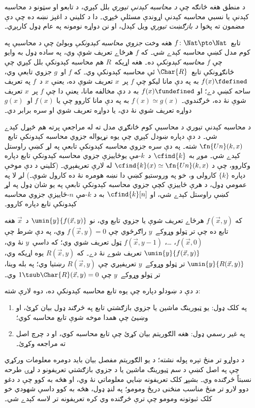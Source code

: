 \documentclass[../../../include/open-logic-section]{subfiles}
\begin{document}

د منطق هغه څانګه چې \emph{د محاسبه کېدنې تيوري} بلل کېږي، د تابعو او
سټونو د محاسبه کېدنې يا نسبي محاسبه کېدنې اړوندې مسئلې څېړي۔ دا د
کليني د اغېز نښه ده چې دې مضمون ته پخوا \emph{د بازګښت تيوري} ويل
کېدل، او نن دواړه نومونه په عام ډول کارېږي۔

تابع~$f\colon \Nat \pto \Nat$ هغه وخت \emph{جزوي محاسبه کېدونکې}
وبولئ چې د محاسبې په کوم مدل کښې محاسبه کېدے شي۔ که $f$ هرځاے تعريف
شوې وي، په ساده ډول به وايو چې $f$ \emph{محاسبه کېدونکې} ده۔ هغه
اړيکه~$R$ هم محاسبه کېدونکې بلل کېږي چې ځانګړونکې تابع~$\Char{R}$ ئې
محاسبه کېدونکې وي۔ که $f$ او~$g$ جزوي تابعې وي، $f(x) \fdefined$ به
په دې مانا ليکو چې $f$ پر~$x$ تعريف شوې ده، يعنې $x$ د~$f$ په تعريف
ساحه کښې دے؛ او $f(x) \fundefined$ به د دې مخالفه مانا، يعنې دا چې
$f$ پر~$x$ تعريف شوې نۀ ده، څرګندوي۔ $f(x) \simeq g(x)$ به په دې
مانا کاروو چې يا $f(x)$ او~$g(x)$ دواړه تعريف شوي نۀ دي، يا دواړه
تعريف شوي او سره برابر دي۔

د محاسبه کېدنې تيوري د محاسبې کوم ځانګړي مدل ته له مراجعې پرته هم
څېړل کېدے شي۔ د دې دپاره ښودل کېږي چې يوه نړيواله جزوي محاسبه
کېدونکې تابع~$\fn{Un}(k,x)$ شته۔ په دې سره جزوي محاسبه کېدونکې تابعې
په لړ کښې راوستل کېدے شي۔ موږ به $\cfind{k}$ د~$k$-مې يوځاييزې جزوي
محاسبه کېدونکې تابع دپاره وکاروو، چې د
$\cfind{k}(x) \simeq \fn{Un}(k,x)$ له لارې تعريفېږي۔ (کليني د دې
موخې دپاره $\{ k \}$ کارولی و، خو په وروستيو کښې دا نښه هومره نۀ ده
کارول شوې۔) لږ لا په عمومي ډول، د هرې ځاييزې کچې جزوي محاسبه کېدونکې
تابعې په يو شان ډول په لړ کښې راوستل کېدے شي، او $\cfind{k}[n]$ به د
$k$-مې $n$-ځاييزې جزوي محاسبه کېدونکې تابع دپاره کاروو۔

که $f(\vec x,y)$ هرځاے تعريف شوې يا جزوي تابع وي، نو
$\umin{y}{f(\vec x,y)}$ د~$\vec x$ هغه تابع ده چې تر ټولو وړوکے~$y$
راګرځوي چې $f(\vec x,y)=0$ وي، په دې شرط چې $f(\vec x,0)$، \dots،
$f(\vec x,y-1)$ ټول تعريف شوي وي؛ که داسې~$y$ نۀ وي،
$\umin{y}{f(\vec x,y)}$ تعريف شوے نۀ دے۔ که $R(\vec x,y)$ يوه اړيکه
وي، $\umin{y}{R(\vec x,y)}$ تر ټولو وړوکے~$y$ تعريفېږي چې
$R(\vec x,y)$ رښتيا وي؛ په بله وينا، تر ټولو وړوکے~$y$ چې
$1 \tsub \Char{R}(\vec x,y)=0$ وي۔

د دې د ښودلو دپاره چې يوه تابع محاسبه کېدونکې ده، دوه لارې شته:
\begin{enumerate}
\item په کلک ډول: يو ټيورينګ ماشين يا جزوي بازګشتي تابع په څرګند ډول
  بيان کړئ، او وښيئ چې همدا موخه شوې تابع محاسبه کوي؛
\item په غير رسمي ډول: هغه الګوريتم بيان کړئ چې تابع محاسبه کوي، او د
  چرچ اصل ته مراجعه وکړئ۔
\end{enumerate}
د دواړو تر منځ تېره پوله نشته؛ د يو الګوريتم مفصل بيان بايد دومره
معلومات ورکړي چې په اصل کښې د سم ټيورينګ ماشين يا د جزوي بازګشتي
تعريفونو د لړۍ طرحه نسبتاً څرګنده وي۔ بشپړ کلک تعريفونه ښايي معلوماتي
نۀ وي، او هڅه به کوو چې د دغو دوو لارو تر منځ مناسب منځنی دريځ ومومو؛
په لنډ ډول، هڅه به کوو داسې شهودي خو کلک ثبوتونه ومومو چې ترې څرګنده
وي کره تعريفونه تر لاسه کېدے شي۔
\end{document}
